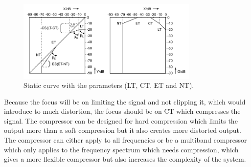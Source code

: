\begin{figure}[H]
\centering
\includegraphics[width=0.8\textwidth]{figures/limiter_static_curve.png}
\caption{Static curve with the parameters (LT, CT, ET and NT).}
\label{fig:limiter_static}
\end{figure}  

Because the focus will be on limiting the signal and not clipping it, which would introduce to much distortion, the focus should be on CT which compresses the signal. The compressor can be designed for hard compression which limits the output more than a soft compression but it also creates more distorted output. The compressor can either apply to all frequencies or be a multiband compressor which only applies to the frequency spectrum which needs compression, which gives a more flexible compressor but also increases the complexity of the system.    

      